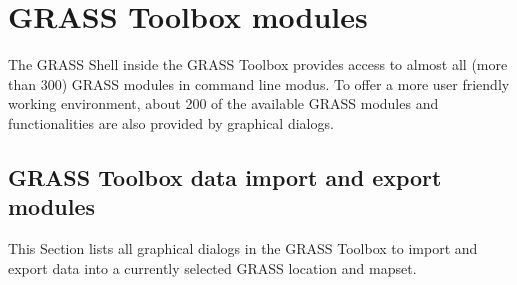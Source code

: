 \section{GRASS Toolbox modules}\label{appdx_grass_toolbox_modules}


The GRASS Shell inside the GRASS Toolbox provides access to almost all (more 
than 300) GRASS modules in command line modus. To offer a more user
friendly working environment, about 200 of the available GRASS modules and 
functionalities are also provided by graphical dialogs.

\subsection{GRASS Toolbox data import and export modules}

This Section lists all graphical dialogs in the GRASS Toolbox to import and
export data into a currently selected GRASS location and mapset.

